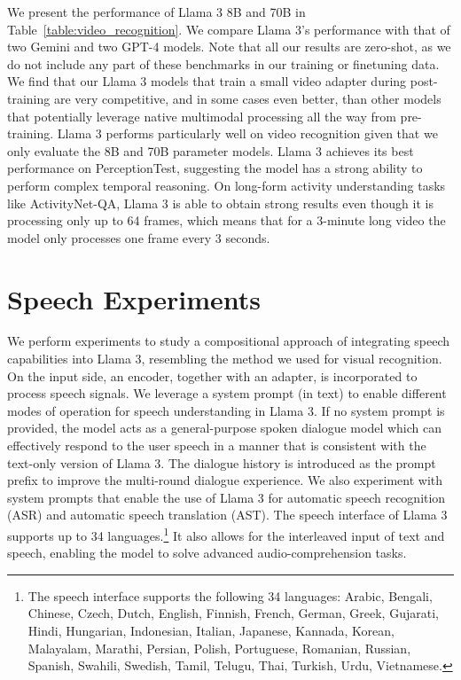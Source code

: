 \documentclass[dvipsnames]{fairmeta}
\begin{document}
We present the performance of Llama 3 8B and 70B in Table~\ref{table:video_recognition}.
We compare Llama 3's performance with that of two Gemini and two GPT-4 models. Note that all our results are zero-shot, as we do not include any part of these benchmarks in our training or finetuning data. We find that our Llama 3 models that train a small video adapter during post-training are very competitive, and in some cases even better, than other models that potentially leverage native multimodal processing all the way from pre-training.
Llama 3 performs particularly well on video recognition given that we only evaluate the 8B and 70B parameter models.
Llama 3 achieves its best performance on PerceptionTest, suggesting the model has a strong ability to perform complex temporal reasoning.  On long-form activity understanding tasks like ActivityNet-QA, Llama 3 is able to obtain strong results even though it is processing only up to 64 frames, which means that for a 3-minute long video the model only processes one frame every 3 seconds.

\section{Speech Experiments}
\label{section:speech}

We perform experiments to study a compositional approach of integrating speech capabilities into Llama 3, resembling the method we used for visual recognition. On the input side, an encoder, together with an adapter, is incorporated to process speech signals. We leverage a system prompt (in text) to enable different modes of operation for speech understanding in Llama 3.
If no system prompt is provided, the model acts as a general-purpose spoken dialogue model which can effectively respond to the user speech in a manner that is consistent with the text-only version of Llama 3.
The dialogue history is introduced as the prompt prefix to improve the multi-round dialogue experience.
We also experiment with system prompts that enable the use of Llama 3 for automatic speech recognition (ASR) and automatic speech translation (AST).
The speech interface of Llama 3 supports up to 34 languages.\footnote{The speech interface supports the following 34 languages:
	Arabic,
	Bengali,
	Chinese,
	Czech,
	Dutch,
	English,
	Finnish,
	French,
	German,
	Greek,
	Gujarati,
	Hindi,
	Hungarian,
	Indonesian,
	Italian,
	Japanese,
	Kannada,
	Korean,
	Malayalam,
	Marathi,
	Persian,
	Polish,
	Portuguese,
	Romanian,
	Russian,
	Spanish,
	Swahili,
	Swedish,
	Tamil,
	Telugu,
	Thai,
	Turkish,
	Urdu,
	Vietnamese.}
It also allows for the interleaved input of text and speech, enabling the model to solve advanced audio-comprehension tasks.
\end{document}
